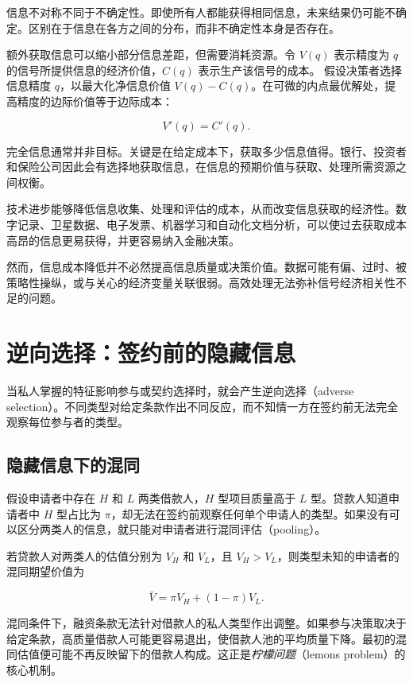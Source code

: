 信息不对称不同于不确定性。即使所有人都能获得相同信息，未来结果仍可能不确定。区别在于信息在各方之间的分布，而非不确定性本身是否存在。

额外获取信息可以缩小部分信息差距，但需要消耗资源。令 \(V(q)\) 表示精度为 \(q\) 的信号所提供信息的经济价值，\(C(q)\) 表示生产该信号的成本。
假设决策者选择信息精度 \(q\)，以最大化净信息价值 \(V(q)-C(q)\)。在可微的内点最优解处，提高精度的边际价值等于边际成本：

\begin{equation}
V'(q)=C'(q).
\label{eq:ch3-information-acquisition}
\end{equation}

完全信息通常并非目标。关键是在给定成本下，获取多少信息值得。银行、投资者和保险公司因此会有选择地获取信息，在信息的预期价值与获取、处理所需资源之间权衡。

技术进步能够降低信息收集、处理和评估的成本，从而改变信息获取的经济性。数字记录、卫星数据、电子发票、机器学习和自动化文档分析，可以使过去获取成本高昂的信息更易获得，并更容易纳入金融决策。

然而，信息成本降低并不必然提高信息质量或决策价值。数据可能有偏、过时、被策略性操纵，或与关心的经济变量关联很弱。高效处理无法弥补信号经济相关性不足的问题。

\section{逆向选择：签约前的隐藏信息}

当私人掌握的特征影响参与或契约选择时，就会产生逆向选择（adverse selection）。不同类型对给定条款作出不同反应，而不知情一方在签约前无法完全观察每位参与者的类型。

\subsection{隐藏信息下的混同}

假设申请者中存在 $H$ 和 $L$ 两类借款人，$H$ 型项目质量高于 $L$ 型。贷款人知道申请者中 $H$ 型占比为 $\pi$，却无法在签约前观察任何单个申请人的类型。如果没有可以区分两类人的信息，就只能对申请者进行混同评估（pooling）。

若贷款人对两类人的估值分别为 $V_H$ 和 $V_L$，且 $V_H>V_L$，则类型未知的申请者的混同期望价值为

\begin{equation}
\bar V=\pi V_H+(1-\pi)V_L.
\label{eq:ch3-pooling-value}
\end{equation}

混同条件下，融资条款无法针对借款人的私人类型作出调整。如果参与决策取决于给定条款，高质量借款人可能更容易退出，使借款人池的平均质量下降。最初的混同估值便可能不再反映留下的借款人构成。这正是\emph{柠檬问题}（lemons problem）的核心机制。

